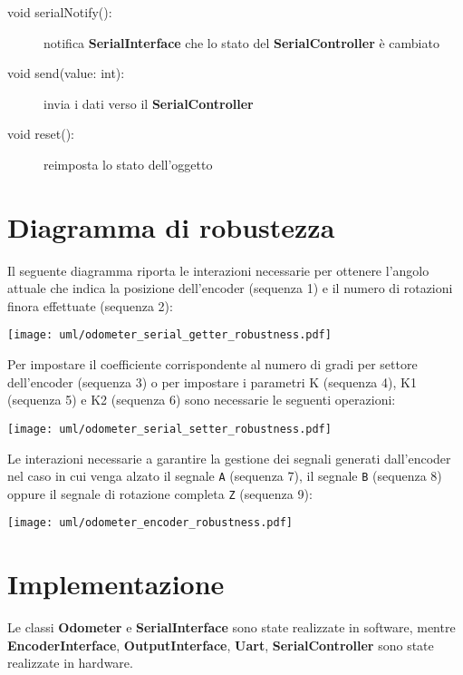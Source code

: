 \documentclass [11pt,a4paper,oneside]{paper}
\newcommand{\component}[1]{\textbf{#1}}
\newcommand{\identifier}[1]{\texttt{#1}}
\begin{document}
\begin{description}
\item[void serialNotify():] notifica \component{SerialInterface} che
    lo stato del \component{SerialController} è cambiato
\item[void send(value: int):] invia i dati verso il
    \component{SerialController}
\item[void reset():] reimposta lo stato dell'oggetto
\end{description}

\section{Diagramma di robustezza}
Il seguente diagramma riporta le interazioni necessarie per ottenere
l'angolo attuale che indica la posizione dell'encoder (sequenza 1) e
il numero di rotazioni finora effettuate (sequenza 2):
\begin{center}
    \texttt{[image: uml/odometer\_serial\_getter\_robustness.pdf]}
    \label{serial_getter_robustness}
\end{center}

Per impostare il coefficiente corrispondente al numero di gradi per settore
dell'encoder (sequenza 3) o per impostare i parametri K (sequenza 4), K1
(sequenza 5) e K2 (sequenza 6) sono necessarie le seguenti operazioni:
\begin{center}
    \texttt{[image: uml/odometer\_serial\_setter\_robustness.pdf]}
    \label{serial_getter_robustness}
\end{center}

Le interazioni necessarie a garantire la gestione dei segnali
generati dall'encoder nel caso in cui venga alzato il segnale
\identifier{A} (sequenza 7), il segnale \identifier{B} (sequenza 8)
oppure il segnale di rotazione completa \identifier{Z} (sequenza 9):

\begin{center}
    \texttt{[image: uml/odometer\_encoder\_robustness.pdf]}
    \label{encoder_robustness}
\end{center}


\section{Implementazione}

Le classi \component{Odometer} e \component{SerialInterface} sono state
realizzate in software, mentre \component{EncoderInterface}, 
\component{OutputInterface}, \component{Uart}, \component{SerialController}
sono state realizzate in hardware.
\end{document}
